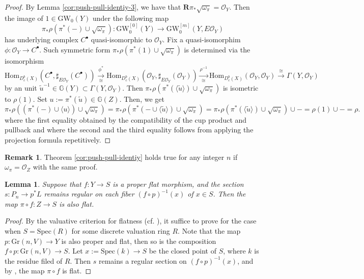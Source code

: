 \documentclass[a4paper]{amsart}
\theoremstyle{plain}
\newtheorem{lemma}[theorem]{Lemma}
\theoremstyle{definition}
\newtheorem{remark}[theorem]{Remark}
\numberwithin{equation}{section}
\newcommand{\GW}{\mathrm{GW}}
\newcommand{\Gr}{\mathrm{Gr}}
\newcommand{\SO}{\mathcal{O}}
\begin{document}
\begin{proof}
    By Lemma \ref{cor:push-pull-identiy-3}, we have that $\mathbf{R}\pi_* \sqrt{\omega_\pi} = \SO_Y$. Then the image of $1 \in \GW_0(Y)$ under the following map
    \[
        \pi_*\rho (\pi^*(-) \cup \sqrt{\omega_\pi}): \GW_0^{[0]}(Y) \to \GW_0^{[m]}(Y,E\SO_Y)
    \]
    has underlying complex $C^\bullet$ quasi-isomorphic to $\SO_Y$. Fix a quasi-isomorphim $\phi:\SO_Y \to C^\bullet$. Such symmetric form $\pi_*\rho (\pi^*(1) \cup \sqrt{\omega_\pi})$ is determined via the isomorphism
    \[
        \mathrm{Hom}_{D^{b}_c(X)}(C^\bullet, \sharp_{E \SO_Y}(C^\bullet)) \xrightarrow[\cong]{\phi^*} \mathrm{Hom}_{D^{b}_c(X)}(\SO_Y, \sharp_{E \SO_Y}(\SO_Y)) \xrightarrow[\cong]{\rho^{-1}} \mathrm{Hom}_{D^{b}_c(X)}(\SO_Y, \SO_Y) \xrightarrow{\cong} \Gamma(Y, \SO_Y)
    \]
    by an unit $\tilde{u}^{-1} \in \mathbb{G}(Y) \subset  \Gamma(Y, \SO_Y)$.
    Then $\pi_*\rho (\pi^*(\langle\tilde{u}\rangle) \cup \sqrt{\omega_\pi})$ is isometric to $\rho(1)$. Set $u := \pi^*(\tilde{u}) \in \mathbb{G}(Z)$. Then, we get
    \[
        \pi_*\rho ((\pi^*(-)\cup \langle u \rangle ) \cup \sqrt{\omega_\pi}) =  \pi_*\rho (\pi^*(-\cup \langle \tilde{u} \rangle )  \cup \sqrt{\omega_\pi})  =  \pi_*\rho (\pi^*(\langle \tilde{u} \rangle)  \cup \sqrt{\omega_\pi}) \cup - = \rho(1) \cup - = \rho.
    \]
    where the first equality obtained by the compatibility of the cup product and pullback and where the second and the third equality follows from applying the projection formula repetitively.
\end{proof}
\begin{remark}\label{rmk:alignment-remark}
    Theorem \ref{cor:push-pull-identiy} holds true for any integer $n$ if $\omega_\pi = \SO_Z$ with the same proof.
\end{remark}

\begin{lemma}\label{lma:proper_flat_regular_section}
    Suppose that $f:Y \to S$ is a proper flat morphism, and the section $s:{P }_n \to p^* L$ remains regular on each fiber $(f\circ p)^{-1}(x)$ of $x\in S$. Then the map $\pi \circ f:Z \to S$ is also flat.
\end{lemma}
\begin{proof}
    By the valuative criterion for flatness (cf. \cite[Theorem 14.34, p.440]{gortz2020algebraic}), it suffice to prove for the case when $S =  \mathrm{Spec}(R)$ for some discrete valuation ring $R$. Note that the map $p: \Gr(n,{V }) \to Y$ is also proper and flat, then so is the composition $f\circ p:\Gr(n,{V }) \to S$. Let $x:=\mathrm{Spec}(k) \to S$ be the closed point of $S$, where $k$ is the residue filed of $R$. Then $s$ remains a regular section on $(f\circ p)^{-1}(x)$, and by \cite[\href{https://stacks.math.columbia.edu/tag/0470}{Lemma 0470}]{stacks-project}, the map $\pi \circ f$ is flat.
\end{proof}
\end{document}
